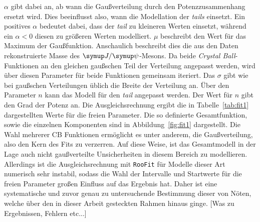 %
$\alpha$ gibt dabei an, ab wann die Gaußverteilung durch den Potenzzusammenhang ersetzt wird. Dies beeinflusst also, wann die Modellation der \textit{tails}
einsetzt. Ein positives $\alpha$ bedeutet dabei, dass der \textit{tail} zu kleineren Werten einsetzt, während ein $\alpha<0$
diesen zu größeren Werten modelliert. $\mu$ beschreibt den Wert für das Maximum der Gaußfunktion. Anschaulich beschreibt dies die aus
den Daten rekonstruierte Masse des $\jpsi$-Mesons. Da beide \textit{Crystal Ball}-Funktionen an den gleichen gaußschen Teil der Verteilung angepasst werden,
wird über diesen Parameter für beide Funktionen gemeinsam iteriert. Das $\sigma$ gibt wie bei gaußschen Verteilungen üblich die Breite der Verteilung an. Über den Parameter $n$ kann das Modell für den \textit{tail} angepasst werden. Der Wert für $n$ gibt den Grad der Potenz an.
Die Ausgleichsrechnung ergibt die in Tabelle~\ref{tab:fit1} dargestellten Werte für die freien Parameter. Die so definierte Gesamtfunktion, sowie die einzelnen Komponenten sind in Abbildung~\ref{fig:fit1} dargestellt. Die Wahl mehrerer CB Funktionen ermöglicht es unter anderem, die Gaußverteilung, also den Kern des Fits zu verzerren. Auf diese Weise, ist das Gesamtmodell in der Lage auch nicht gaußverteilte Unsicherheiten in diesem Bereich zu modellieren. Allerdings ist die Ausgleichsrechnung mit \texttt{RooFit} für Modelle dieser Art numerisch sehr instabil, sodass die Wahl der Intervalle und Startwerte für die freien Parameter großen Einfluss auf das Ergebnis hat. Daher ist eine systematische und zuvor genau zu untersuchende Bestimmung dieser von Nöten, welche über den in dieser Arbeit gesteckten Rahmen hinaus ginge. [Was zu Ergebnissen, Fehlern etc...]
%
